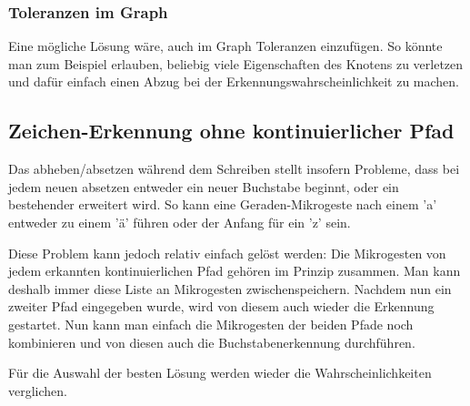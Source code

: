 \subsubsection{Toleranzen im Graph}
Eine mögliche Lösung wäre, auch im Graph Toleranzen einzufügen. So könnte man zum Beispiel erlauben, beliebig viele Eigenschaften des Knotens zu verletzen und dafür einfach einen Abzug bei der Erkennungswahrscheinlichkeit zu machen. 

\subsection{Zeichen-Erkennung ohne kontinuierlicher Pfad}
Das abheben/absetzen während dem Schreiben stellt insofern Probleme, dass bei jedem neuen absetzen entweder ein neuer Buchstabe beginnt, oder ein bestehender erweitert wird. So kann eine Geraden-Mikrogeste nach einem 'a' entweder zu einem 'ä' führen oder der Anfang für ein 'z' sein.

Diese Problem kann jedoch relativ einfach gelöst werden: Die Mikrogesten von jedem erkannten kontinuierlichen Pfad gehören im Prinzip zusammen. Man kann deshalb immer diese Liste an Mikrogesten zwischenspeichern. Nachdem nun ein zweiter Pfad eingegeben wurde, wird von diesem auch wieder die Erkennung gestartet. Nun kann man einfach die Mikrogesten der beiden Pfade noch kombinieren und von diesen auch die Buchstabenerkennung durchführen.

Für die Auswahl der besten Lösung werden wieder die Wahrscheinlichkeiten verglichen. 

